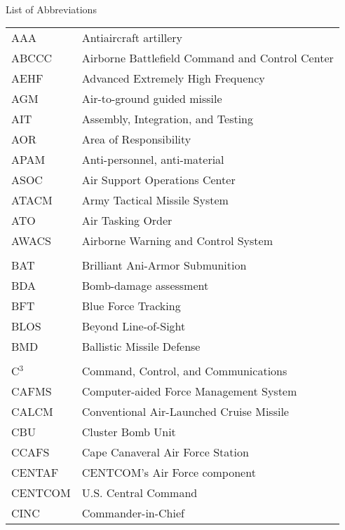 



\renewcommand{\baselinestretch}{1}
\small\normalsize
\hbox{\ }

\vspace{-4em}

\begin{center}
\large{List of Abbreviations}
\end{center}

\vspace{3pt}

\begin{supertabular}{ll}
AAA & Antiaircraft artillery \\
ABCCC & Airborne Battlefield Command and Control Center \\
AEHF & Advanced Extremely High Frequency \\
AGM & Air-to-ground guided missile \\
AIT & Assembly, Integration, and Testing \\
AOR & Area of Responsibility \\
APAM & Anti-personnel, anti-material \\
ASOC & Air Support Operations Center \\
ATACM & Army Tactical Missile System \\
ATO & Air Tasking Order \\
AWACS & Airborne Warning and Control System \\
\\
BAT & Brilliant Ani-Armor Submunition \\
BDA & Bomb-damage assessment  \\
BFT & Blue Force Tracking \\
BLOS & Beyond Line-of-Sight \\
BMD & Ballistic Missile Defense \\
\\
C$^{3}$ & Command, Control, and Communications \\
CAFMS & Computer-aided Force Management System \\
CALCM & Conventional Air-Launched Cruise Missile \\
CBU & Cluster Bomb Unit \\
CCAFS & Cape Canaveral Air Force Station \\
CENTAF & CENTCOM's Air Force component \\
CENTCOM & U.S. Central Command \\
CINC & Commander-in-Chief \\

\end{supertabular}
